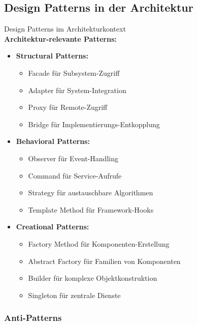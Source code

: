 \subsection{Design Patterns in der Architektur}

\begin{concept}{Design Patterns im Architekturkontext}\\
    \small
\textbf{Architektur-relevante Patterns:}
\begin{itemize}
    \item \textbf{Structural Patterns:}
    \begin{itemize}
        \item Facade für Subsystem-Zugriff
        \item Adapter für System-Integration
        \item Proxy für Remote-Zugriff
        \item Bridge für Implementierungs-Entkopplung
    \end{itemize}
    
    \item \textbf{Behavioral Patterns:}
    \begin{itemize}
        \item Observer für Event-Handling
        \item Command für Service-Aufrufe
        \item Strategy für austauschbare Algorithmen
        \item Template Method für Framework-Hooks
    \end{itemize}
    
    \item \textbf{Creational Patterns:}
    \begin{itemize}
        \item Factory Method für Komponenten-Erstellung
        \item Abstract Factory für Familien von Komponenten
        \item Builder für komplexe Objektkonstruktion
        \item Singleton für zentrale Dienste
    \end{itemize}
\end{itemize}
\end{concept}

\subsubsection{Anti-Patterns}

